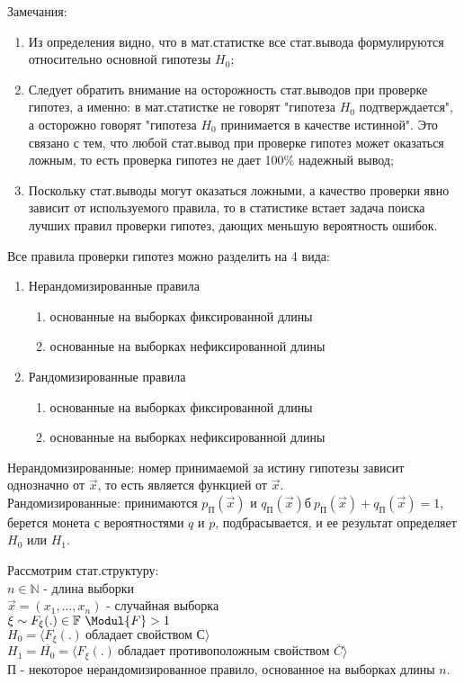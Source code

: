 Замечания:
\begin{enumerate}
  \item Из определения видно, что в мат.статистке все стат.вывода формулируются относительно основной гипотезы $H_0$;
  \item Следует обратить внимание на осторожность стат.выводов при проверке гипотез, а именно:
  в мат.статистке не говорят "гипотеза $H_0$ подтверждается", а осторожно говорят "гипотеза $H_0$ принимается в качестве
  истинной". Это связано с тем, что любой стат.вывод при проверке гипотез может оказаться ложным, то есть проверка гипотез
  не дает 100\% надежный вывод;
  \item Поскольку стат.выводы могут оказаться ложными, а качество проверки явно зависит от используемого правила, то в статистике встает
  задача поиска лучших правил проверки гипотез, дающих меньшую вероятность ошибок.
\end{enumerate}

Все правила проверки гипотез можно разделить на 4 вида:
\begin{enumerate}
  \item Нерандомизированные правила
  \begin{enumerate}
    \item основанные на выборках фиксированной длины
    \item основанные на выборках нефиксированной длины
  \end{enumerate}
  \item Рандомизированные правила
  \begin{enumerate}
    \item основанные на выборках фиксированной длины
    \item основанные на выборках нефиксированной длины
  \end{enumerate}
\end{enumerate}

Нерандомизированные: номер принимаемой за истину гипотезы зависит однозначно
от $\overrightarrow{x}$, то есть является функцией от $\overrightarrow{x}$.\\

Рандомизированные: принимаются $p_{\text{П}}(\overrightarrow{x})$ и
$q_{\text{П}}(\overrightarrow{x})б \ p_{\text{П}}(\overrightarrow{x}) + q_{\text{П}}(\overrightarrow{x}) = 1$,
берется монета с вероятностями $q$ и $p$, подбрасывается, и ее результат определяет $H_0$ или $H_1$.

Рассмотрим стат.структуру:\\
$n \in \mathbb{N}$ - длина выборки\\
$\overrightarrow{x}=(x_1,\ldots,x_n)$ - случайная выборка\\
$\xi \sim F_{\xi}(.) \in \mathbb{F} \ \Modul{F} > 1$\\
$H_0=\langle F_{\xi}(.) \ \text{обладает свойством С}\rangle$\\
$H_1=\overline{H_0}=\langle F_{\xi}(.) \ \text{обладает противоположным свойством $\overline{C}$}\rangle$\\
П - некоторое нерандомизированное правило, основанное на выборках длины $n$.\\

